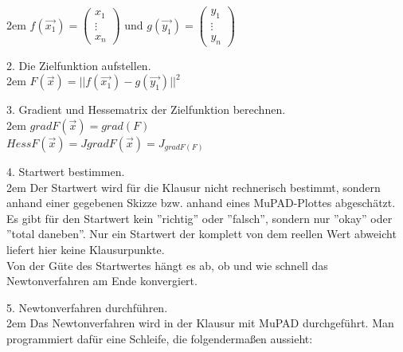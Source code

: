 \documentclass[11pt,final]{scrreprt}
\begin{document}
\begingroup
\leftskip2em 
$ f(\overrightarrow{x_1})=\left(\begin{matrix}
x_1\\
\vdots\\
x_n
\end{matrix}\right) $ und $ g(\overrightarrow{y_1})=\left(\begin{matrix}
y_1\\
\vdots\\
y_n
\end{matrix}\right) $\\
\par	
\endgroup

2. Die Zielfunktion aufstellen.\\

\begingroup
\leftskip2em 
$ F(\overrightarrow{x}) = ||f(\overrightarrow{x_1})-g(\overrightarrow{y_1})||^2 $\\
\par	
\endgroup

3. Gradient und Hessematrix der Zielfunktion berechnen.\\

\begingroup
\leftskip2em 
$ gradF(\overrightarrow{x}) = grad(F) $\\
$ HessF(\overrightarrow{x}) = JgradF(\overrightarrow{x}) = J_{gradF(F)} $\\
\par	
\endgroup

4. Startwert bestimmen.\\

\begingroup
\leftskip2em 
Der Startwert wird für die Klausur nicht rechnerisch bestimmt, sondern anhand einer gegebenen Skizze bzw. anhand eines MuPAD-Plottes abgeschätzt. Es gibt für den Startwert kein ''richtig'' oder ''falsch'', sondern nur ''okay'' oder ''total daneben''. Nur ein Startwert der komplett von dem reellen Wert abweicht liefert hier keine Klausurpunkte.\\
Von der Güte des Startwertes hängt es ab, ob und wie schnell das Newtonverfahren am Ende konvergiert.\\
\par	
\endgroup

5. Newtonverfahren durchführen.\\

\begingroup
\leftskip2em 
Das Newtonverfahren wird in der Klausur mit MuPAD durchgeführt. Man programmiert dafür eine Schleife, die folgendermaßen aussieht:\\
\end{document}
